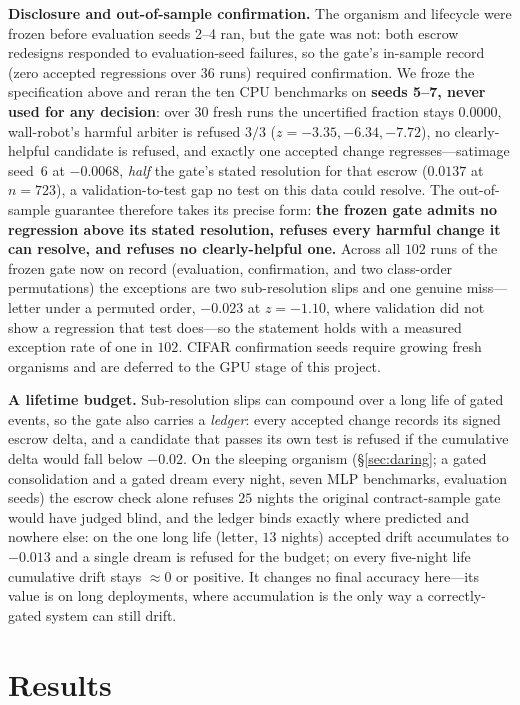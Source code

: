 \documentclass{article}
\begin{document}
\textbf{Disclosure and out-of-sample confirmation.} The organism and lifecycle
were frozen before evaluation seeds 2--4 ran, but the gate was not: both
escrow redesigns responded to evaluation-seed failures, so the gate's
in-sample record (zero accepted regressions over $36$ runs) required
confirmation. We froze the specification above and reran the ten CPU
benchmarks on \textbf{seeds 5--7, never used for any decision}: over $30$
fresh runs the uncertified fraction stays $0.0000$, wall-robot's harmful
arbiter is refused $3/3$ ($z=-3.35,-6.34,-7.72$), no clearly-helpful candidate
is refused, and exactly one accepted change regresses---satimage seed~$6$ at
$-0.0068$, \emph{half} the gate's stated resolution for that escrow ($0.0137$
at $n{=}723$), a validation-to-test gap no test on this data could resolve.
The out-of-sample guarantee therefore takes its precise form: \textbf{the
frozen gate admits no regression above its stated resolution, refuses every
harmful change it can resolve, and refuses no clearly-helpful one.} Across all
$102$ runs of the frozen gate now on record (evaluation, confirmation, and two
class-order permutations) the exceptions are two sub-resolution slips and one
genuine miss---letter under a permuted order, $-0.023$ at $z=-1.10$, where
validation did not show a regression that test does---so the statement holds
with a measured exception rate of one in $102$. CIFAR
confirmation seeds require growing fresh organisms and are deferred to the
GPU stage of this project.

\textbf{A lifetime budget.} Sub-resolution slips can compound over a long life
of gated events, so the gate also carries a \emph{ledger}: every accepted change
records its signed escrow delta, and a candidate that passes its own test is
refused if the cumulative delta would fall below $-0.02$. On the sleeping
organism (\S\ref{sec:daring}; a gated consolidation and a gated dream every
night, seven MLP benchmarks, evaluation seeds) the escrow check alone refuses
$25$ nights the original contract-sample gate would have judged blind, and the
ledger binds exactly where predicted and nowhere else: on the one long life
(letter, $13$ nights) accepted drift accumulates to $-0.013$ and a single dream
is refused for the budget; on every five-night life cumulative drift stays
${\approx}0$ or positive. It changes no final accuracy here---its value is on
long deployments, where accumulation is the only way a correctly-gated system
can still drift.

\section{Results}\label{sec:results}
\end{document}
